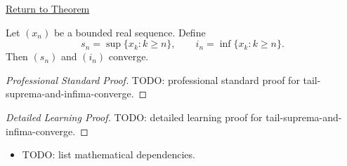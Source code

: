 \newpage
{}
\label{prf:tail-suprema-and-infima-converge}

\begin{remark*}[Return]
\hyperref[thm:tail-suprema-and-infima-converge]{Return to Theorem}
\end{remark*}

\begin{theorem*}
Let $(x_n)$ be a bounded real sequence. Define
\[
  s_n=\sup\{x_k:k\ge n\},
  \qquad
  i_n=\inf\{x_k:k\ge n\}.
\]
Then $(s_n)$ and $(i_n)$ converge.

\smallskip
\noindent
\end{theorem*}

\begin{proof}[Professional Standard Proof]
\LRAProofBodyStart
TODO: professional standard proof for tail-suprema-and-infima-converge.
\end{proof}

\begin{proof}[Detailed Learning Proof]
\LRAProofBodyStart
TODO: detailed learning proof for tail-suprema-and-infima-converge.
\end{proof}

\begin{remark*}
\end{remark*}

\begin{dependencies}
\begin{itemize}
  \item TODO: list mathematical dependencies.
\end{itemize}
\end{dependencies}

\clearpage
